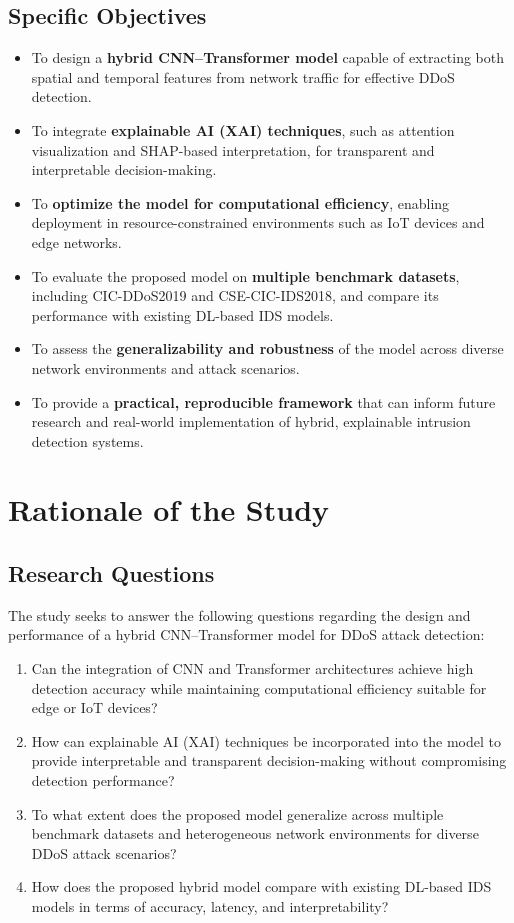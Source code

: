 \documentclass[12pt, a4paper]{report}
\begin{document}
\section{Specific Objectives}
\begin{itemize}
    \item To design a \textbf{hybrid CNN--Transformer model} capable of extracting both spatial and temporal features from network traffic for effective DDoS detection.
    \item To integrate \textbf{explainable AI (XAI) techniques}, such as attention visualization and SHAP-based interpretation, for transparent and interpretable decision-making.
    \item To \textbf{optimize the model for computational efficiency}, enabling deployment in resource-constrained environments such as IoT devices and edge networks.
    \item To evaluate the proposed model on \textbf{multiple benchmark datasets}, including CIC-DDoS2019 and CSE-CIC-IDS2018, and compare its performance with existing DL-based IDS models.
    \item To assess the \textbf{generalizability and robustness} of the model across diverse network environments and attack scenarios.
    \item To provide a \textbf{practical, reproducible framework} that can inform future research and real-world implementation of hybrid, explainable intrusion detection systems.
\end{itemize}

\chapter{Rationale of the Study}


\section{Research Questions}
The study seeks to answer the following questions regarding the design and performance of a hybrid CNN--Transformer model for DDoS attack detection:

\begin{enumerate}
    \item Can the integration of CNN and Transformer architectures achieve high detection accuracy while maintaining computational efficiency suitable for edge or IoT devices?
    \item How can explainable AI (XAI) techniques be incorporated into the model to provide interpretable and transparent decision-making without compromising detection performance?
    \item To what extent does the proposed model generalize across multiple benchmark datasets and heterogeneous network environments for diverse DDoS attack scenarios?
    \item How does the proposed hybrid model compare with existing DL-based IDS models in terms of accuracy, latency, and interpretability?
\end{enumerate}
\end{document}
